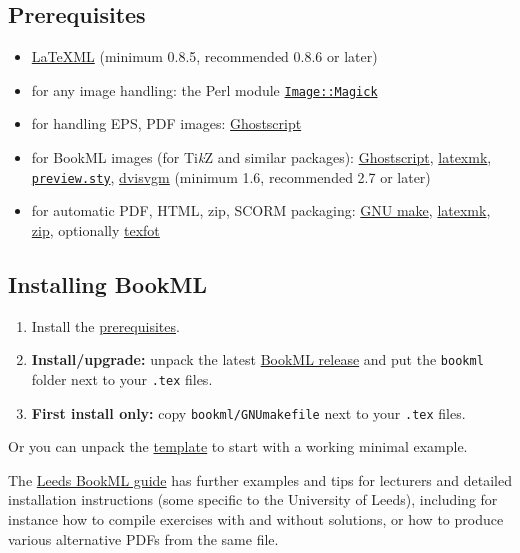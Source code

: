 \documentclass[a4paper,british]{article}
\def\tikzname{Ti\emph{k}Z}
\begin{document}
\subsection{Prerequisites}\label{prerequisites}
\begin{itemize}
\item \href{https://dlmf.nist.gov/LaTeXML/get.html}{LaTeXML} (minimum 0.8.5, recommended 0.8.6 or later)
\item for any image handling: the Perl module \href{https://metacpan.org/pod/Image::Magick}{\texttt{Image::Magick}}
\item for handling EPS, PDF images: \href{https://www.ghostscript.com/}{Ghostscript}
\item for BookML images (for \tikzname{} and similar packages): \href{https://www.ghostscript.com/}{Ghostscript}, \href{https://ctan.org/pkg/latexmk}{latexmk}, \href{https://ctan.org/pkg/preview}{\texttt{preview.sty}}, \href{https://ctan.org/pkg/dvisvgm}{dvisvgm} (minimum 1.6, recommended 2.7 or later)
\item for automatic PDF, HTML, zip, SCORM packaging: \href{https://www.gnu.org/software/make/}{GNU make}, \href{https://ctan.org/pkg/latexmk}{latexmk}, \href{https://sourceforge.net/projects/infozip/}{zip}, optionally \href{https://ctan.org/pkg/texfot}{texfot}
\end{itemize}

\subsection{Installing BookML}
\begin{enumerate}
  \item Install the \hyperref[prerequisites]{prerequisites}.
  \item \textbf{Install/upgrade:} unpack the latest \href{https://github.com/vlmantova/bookml/releases}{BookML release} and put the \texttt{bookml} folder next to your \texttt{.tex} files.
  \item \textbf{First install only:} copy \texttt{bookml/GNUmakefile} next to your \texttt{.tex} files.
\end{enumerate}

Or you can unpack the \href{https://github.com/vlmantova/bookml/releases/latest/download/template.zip}{template} to start with a working minimal example.

The \href{https://vlmantova.github.io/bookmlleeds/}{Leeds BookML guide} has further examples and tips for lecturers and detailed installation instructions (some specific to the University of Leeds), including for instance how to compile exercises with and without solutions, or how to produce various alternative PDFs from the same file.
\end{document}
